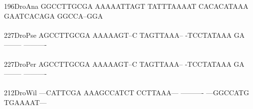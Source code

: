 \documentclass[11pt,twoside,reqno,a4paper]{article}
\begin{document}
{196\hspace*{1\charwidth}DroAna	GGCCTTGCGA	AAAAATTAGT	TATTTAAAAT	CACACATAAA	GAATCACAGA	GGCCA--GGA	\\
\hspace*{4\charwidth}\hspace*{7\charwidth}\hspace*{1\charwidth}\hspace*{1\charwidth}\hspace*{1\charwidth}\hspace*{1\charwidth}\hspace*{1\charwidth}\hspace*{1\charwidth}\\
227\hspace*{1\charwidth}DroPse	AGCCTTGCGA	AAAAAGT--C	TAGTTAAA--	-TCCTATAAA	GA--------	----------	\\
\hspace*{4\charwidth}\hspace*{7\charwidth}\hspace*{1\charwidth}\hspace*{1\charwidth}\hspace*{1\charwidth}\hspace*{1\charwidth}\hspace*{1\charwidth}\hspace*{1\charwidth}\\
227\hspace*{1\charwidth}DroPer	AGCCTTGCGA	AAAAAGT--C	TAGTTAAA--	-TCCTATAAA	GA--------	----------	\\
\hspace*{4\charwidth}\hspace*{7\charwidth}\hspace*{1\charwidth}\hspace*{1\charwidth}\hspace*{1\charwidth}\hspace*{1\charwidth}\hspace*{1\charwidth}\hspace*{1\charwidth}\\
212\hspace*{1\charwidth}DroWil	---CATTCGA	AAAGCCATCT	CCTTAAA---	----------	---GGCCATG	TGAAAAT---	\\
\hspace*{4\charwidth}\hspace*{7\charwidth}\hspace*{1\charwidth}\hspace*{1\charwidth}\hspace*{1\charwidth}\hspace*{1\charwidth}\hspace*{1\charwidth}\hspace*{1\charwidth}\\
}
\end{document}
